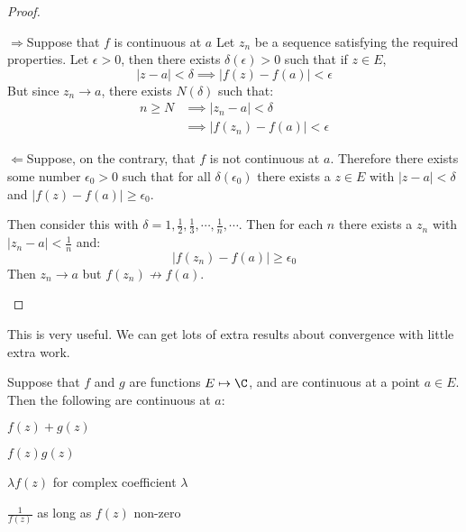 \documentclass[../Main.tex]{subfiles}
\begin{document}
\begin{proof}
    \begin{proofdirection}{$\Rightarrow$}{Suppose that $f$ is continuous at $a$}
        Let $z_n$ be a sequence satisfying the required properties. Let $\epsilon > 0$, then there exists $\delta(\epsilon) > 0$ such that if $z \in E$,
        \begin{equation*}
            |z - a| < \delta \implies |f(z) - f(a)| < \epsilon
        \end{equation*}
        But since $z_n \to a$, there exists $N(\delta)$ such that:
        \begin{align*}
            n \geq N &\implies |z_n - a| < \delta \\
            &\implies |f(z_n) - f(a)| < \epsilon
        \end{align*}
    \end{proofdirection}
    \begin{proofdirection}{$\Leftarrow$}{Suppose, on the contrary, that $f$ is not continuous at $a$.}
        Therefore there exists some number $\epsilon_0 > 0$ such that for all $\delta(\epsilon_0)$ there exists a $z \in E$ with $|z - a| < \delta$ and $|f(z) - f(a)| \geq \epsilon_0$.\par
        Then consider this with $\delta = 1, \frac{1}{2}, \frac{1}{3}, \cdots, \frac{1}{n}, \cdots$. Then for each $n$ there exists a $z_n$ with $|z_n - a| < \frac{1}{n}$ and:
        \begin{equation*}
            |f(z_n) - f(a)| \geq \epsilon_0
        \end{equation*}
        Then $z_n \to a$ but $f(z_n) \not\to f(a)$.
    \end{proofdirection}
\end{proof}
This is very useful. We can get lots of extra results about convergence with little extra work.
\begin{propositions}{
        Suppose that $f$ and $g$ are functions $E \mapsto \C$, and are continuous at a point $a \in E$. Then the following are continuous at $a$:
        \label{propsContinuityProperties}
    }
    \item $f(z) + g(z)$ \label{propSumContinuity}
    \item $f(z)g(z)$ \label{propProductContinuity}
    \item $\lambda f(z)$ for complex coefficient $\lambda$ \label{propScalingContinuity}
    \item $\frac{1}{f(z)}$ as long as $f(z)$ non-zero \label{propReciprocalContinuity}
\end{propositions}
\end{document}
